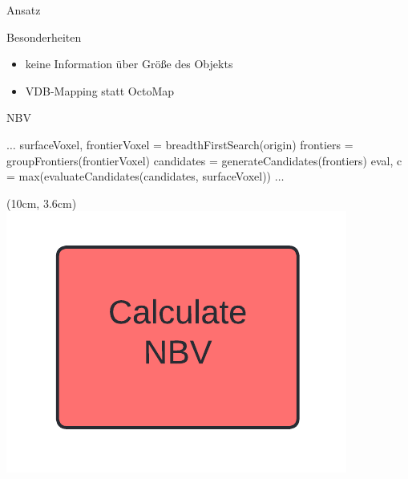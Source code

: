 \documentclass{beamer}
\begin{document}
\begin{frame}{Ansatz}
	\begin{block}{Besonderheiten}
		\begin{itemize}
			\item keine Information über Größe des Objekts
			\item VDB-Mapping statt OctoMap
		\end{itemize}
	\end{block}
	\begin{exampleblock}{}
		\vspace{-0.5cm}
		\begin{algorithm}[H]
			\caption{NBV}
			\begin{algorithmic}[1]
				\State $\dots$
				\State surfaceVoxel, frontierVoxel =  breadthFirstSearch(origin)
				\State frontiers = groupFrontiers(frontierVoxel)
				\State candidates = generateCandidates(frontiers)
				\State eval, c = max(evaluateCandidates(candidates, surfaceVoxel))
				\State $\dots$
				\EndWhile
			\end{algorithmic}
		\end{algorithm}
	\end{exampleblock}

	\begin{textblock*}{0.2\textwidth}(10cm, 3.6cm)
		\includegraphics[width=\textwidth]{Graphics/nbv_flow.png}
	\end{textblock*}

\end{frame}
\end{document}

